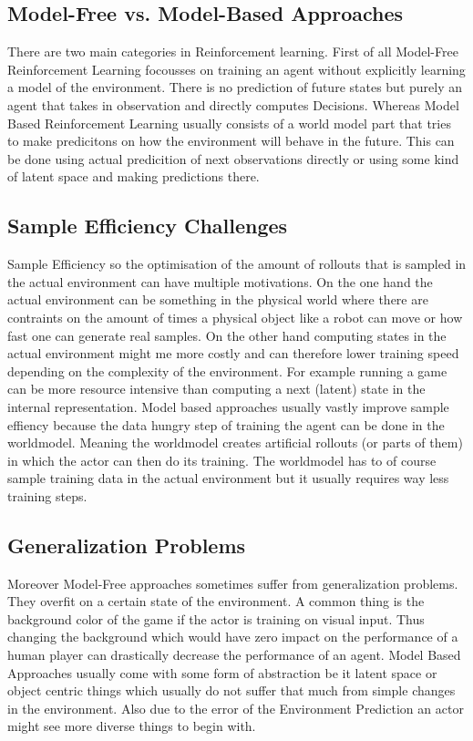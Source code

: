 \documentclass[
	english,
	ruledheaders=section,
	class=report,
	thesis={type=master},
	accentcolor=9c,
	custommargins=true,
	marginpar=false,
	parskip=half-,
	fontsize=11pt,
]{tudapub}
\begin{document}
\subsection{Model-Free vs. Model-Based Approaches}
\label{subsec:mf_vs_mb}
There are two main categories in Reinforcement learning. First of all Model-Free Reinforcement Learning focousses on training an agent without explicitly learning a model of the environment. There is no prediction of future states but purely an agent that takes in observation and directly computes Decisions. Whereas Model Based Reinforcement Learning usually consists of a world model part that tries to make predicitons on how the environment will behave in the future. This can be done using actual predicition of next observations directly or using some kind of latent space and making predictions there.

\subsection{Sample Efficiency Challenges}
\label{subsec:sample_efficiency}
Sample Efficiency so the optimisation of the amount of rollouts that is sampled in the actual environment can have multiple motivations. On the one hand the actual environment can be something in the physical world where there are contraints on the amount of times a physical object like a robot can move or how fast one can generate real samples. On the other hand computing states in the actual environment might me more costly and can therefore lower training speed depending on the complexity of the environment. For example running a game can be more resource intensive than computing a next (latent) state in the internal representation.
Model based approaches usually vastly improve sample effiency because the data hungry step of training the agent can be done in the worldmodel. Meaning the worldmodel creates artificial rollouts (or parts of them) in which the actor can then do its training. The worldmodel has to of course sample training data in the actual environment but it usually requires way less training steps.

\subsection{Generalization Problems}
\label{subsec:generalization}
Moreover Model-Free approaches  sometimes suffer from generalization problems. They overfit on a certain state of the environment. A common thing is the background color of the game if the actor is training on visual input. Thus changing the background which would have zero impact on the performance of a human player can drastically decrease the performance of an agent. Model Based Approaches usually come with some form of abstraction be it latent space or object centric things which usually do not suffer that much from simple changes in the environment. Also due to the error of the Environment Prediction an actor might see more diverse things to begin with.
\end{document}
